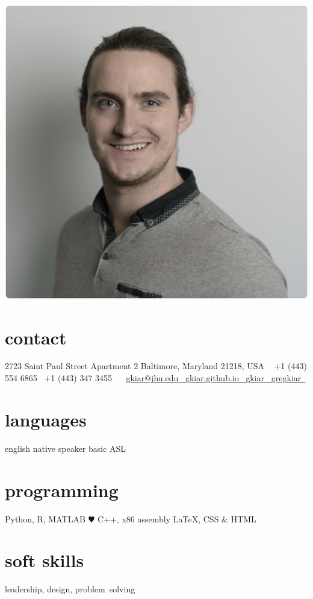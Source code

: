 \documentclass[]{friggeri-cv} %
\begin{document}


\begin{aside} %
\includegraphics[width=\textwidth]{./headshot.pdf}
\section{contact}
2723 Saint Paul Street
Apartment 2
Baltimore, Maryland
21218, USA
~
+1 (443) 554 6865~{\color{green} \faMobilePhone}
+1 (443) 347 3455~{\color{green} \faMobilePhone}
~
\href{mailto:gkiar@jhu.edu}{gkiar@jhu.edu~{\color{red} \faEnvelope}}
\href{http://gkiar.github.io}{gkiar.github.io~{\color{brown} \faGlobe}}
\href{http://github.com/gkiar}{gkiar~{\color{purple} \faGithub}}
\href{https://www.linkedin.com/in/gregkiar}{gregkiar~{\color{blue} \faLinkedin}}
\section{languages}
english native speaker
basic ASL
\section{programming}
Python, R, MATLAB {\color{red} $\varheartsuit$}
C++, x86 assembly
LaTeX, CSS \& HTML
\section{soft skills}
leadership, design, problem~solving
\end{aside}
\end{document}
